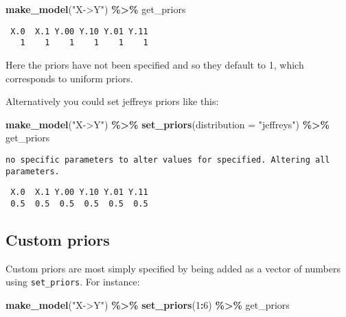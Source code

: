 \documentclass[
  12pt,
]{book}
\newenvironment{Shaded}{\begin{snugshade}}{\end{snugshade}}
\newcommand{\AttributeTok}[1]{\textcolor[rgb]{0.13,0.29,0.53}{#1}}
\newcommand{\DecValTok}[1]{\textcolor[rgb]{0.00,0.00,0.81}{#1}}
\newcommand{\FunctionTok}[1]{\textcolor[rgb]{0.13,0.29,0.53}{\textbf{#1}}}
\newcommand{\NormalTok}[1]{#1}
\newcommand{\SpecialCharTok}[1]{\textcolor[rgb]{0.81,0.36,0.00}{\textbf{#1}}}
\newcommand{\StringTok}[1]{\textcolor[rgb]{0.31,0.60,0.02}{#1}}
\begin{document}
\begin{Shaded}
\begin{Highlighting}[]
\FunctionTok{make\_model}\NormalTok{(}\StringTok{"X{-}\textgreater{}Y"}\NormalTok{) }\SpecialCharTok{\%\textgreater{}\%}\NormalTok{ get\_priors}
\end{Highlighting}
\end{Shaded}

\begin{verbatim}
 X.0  X.1 Y.00 Y.10 Y.01 Y.11 
   1    1    1    1    1    1 
\end{verbatim}

Here the priors have not been specified and so they default to 1, which corresponds to uniform priors.

Alternatively you could set jeffreys priors like this:

\begin{Shaded}
\begin{Highlighting}[]
\FunctionTok{make\_model}\NormalTok{(}\StringTok{"X{-}\textgreater{}Y"}\NormalTok{) }\SpecialCharTok{\%\textgreater{}\%} \FunctionTok{set\_priors}\NormalTok{(}\AttributeTok{distribution =} \StringTok{"jeffreys"}\NormalTok{) }\SpecialCharTok{\%\textgreater{}\%}\NormalTok{ get\_priors}
\end{Highlighting}
\end{Shaded}

\begin{verbatim}
no specific parameters to alter values for specified. Altering all parameters.
\end{verbatim}

\begin{verbatim}
 X.0  X.1 Y.00 Y.10 Y.01 Y.11 
 0.5  0.5  0.5  0.5  0.5  0.5 
\end{verbatim}

\hypertarget{custom-priors}{%
\subsection{Custom priors}\label{custom-priors}}

Custom priors are most simply specified by being added as a vector of numbers using \texttt{set\_priors}. For instance:

\begin{Shaded}
\begin{Highlighting}[]
\FunctionTok{make\_model}\NormalTok{(}\StringTok{"X{-}\textgreater{}Y"}\NormalTok{) }\SpecialCharTok{\%\textgreater{}\%} \FunctionTok{set\_priors}\NormalTok{(}\DecValTok{1}\SpecialCharTok{:}\DecValTok{6}\NormalTok{) }\SpecialCharTok{\%\textgreater{}\%}\NormalTok{ get\_priors}
\end{Highlighting}
\end{Shaded}
\end{document}
